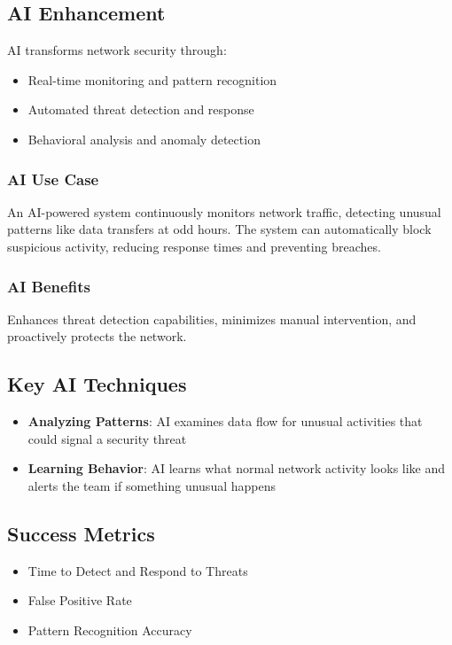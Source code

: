\documentclass[10pt,a4paper]{article}
\begin{document}
\subsection{AI Enhancement}
AI transforms network security through:
\begin{itemize}\itemsep0.5em
    \item Real-time monitoring and pattern recognition
    \item Automated threat detection and response
    \item Behavioral analysis and anomaly detection
\end{itemize}

\subsubsection{AI Use Case}
An AI-powered system continuously monitors network traffic, detecting unusual patterns like data transfers at odd hours. The system can automatically block suspicious activity, reducing response times and preventing breaches.

\subsubsection{AI Benefits}
Enhances threat detection capabilities, minimizes manual intervention, and proactively protects the network.

\subsection{Key AI Techniques}
\begin{itemize}\itemsep0.5em
    \item \textbf{Analyzing Patterns}: AI examines data flow for unusual activities that could signal a security threat
    \item \textbf{Learning Behavior}: AI learns what normal network activity looks like and alerts the team if something unusual happens
\end{itemize}

\subsection{Success Metrics}
\begin{itemize}\itemsep0.5em
    \item Time to Detect and Respond to Threats
    \item False Positive Rate
    \item Pattern Recognition Accuracy
\end{itemize}
\end{document}
